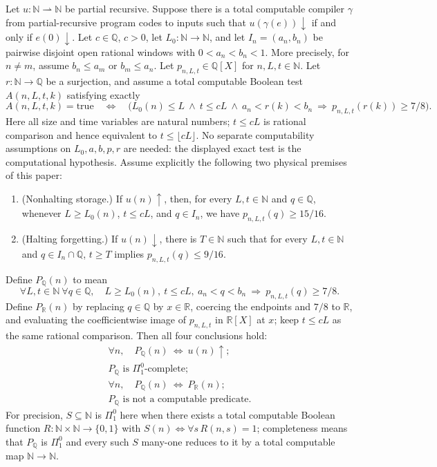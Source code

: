 \begin{theorem}
\label{lean:conditional}
Let $u:\mathbb N\rightharpoonup\mathbb N$ be partial recursive. Suppose there
is a total computable compiler $\gamma$ from partial-recursive program codes
to inputs such that $u(\gamma(e))\downarrow$ if and only if $e(0)\downarrow$.
Let $c\in\mathbb Q$, $c>0$, let $L_0:\mathbb N\to\mathbb N$, and let
$I_n=(a_n,b_n)$ be pairwise disjoint open rational windows with
$0<a_n<b_n<1$. More precisely, for $n\ne m$, assume
$b_n\le a_m$ or $b_m\le a_n$.
Let $p_{n,L,t}\in\mathbb Q[X]$ for $n,L,t\in\mathbb N$.
Let $r:\mathbb N\to\mathbb Q$ be a surjection, and assume a total
computable Boolean test $A(n,L,t,k)$ satisfying exactly
\[
 A(n,L,t,k)=\mathrm{true}\quad\Longleftrightarrow\quad
 \bigl(L_0(n)\le L\ \land\ t\le cL\ \land\ a_n<r(k)<b_n
       \ \Longrightarrow\ p_{n,L,t}(r(k))\ge 7/8\bigr).
\]
Here all size and time variables are natural numbers; $t\le cL$ is
rational comparison and hence equivalent to $t\le\lfloor cL\rfloor$.
No separate computability assumptions on $L_0,a,b,p,r$ are needed:
the displayed exact test is the computational hypothesis.
Assume explicitly the following two physical premises of this paper:
\begin{enumerate}
\item (Nonhalting storage.) If $u(n)\uparrow$, then, for every $L,t\in\mathbb N$
and $q\in\mathbb Q$, whenever $L\ge L_0(n)$, $t\le cL$, and $q\in I_n$,
we have $p_{n,L,t}(q)\ge15/16$.
\item (Halting forgetting.) If $u(n)\downarrow$, there is $T\in\mathbb N$
such that for every $L,t\in\mathbb N$ and $q\in I_n\cap\mathbb Q$,
$t\ge T$ implies $p_{n,L,t}(q)\le9/16$.
\end{enumerate}
Define $P_{\mathbb Q}(n)$ to mean
\[
 \forall L,t\in\mathbb N\ \forall q\in\mathbb Q,\quad
 L\ge L_0(n),\ t\le cL,\ a_n<q<b_n
 \ \Longrightarrow\ p_{n,L,t}(q)\ge7/8.
\]
Define $P_{\mathbb R}(n)$ by replacing $q\in\mathbb Q$ by $x\in\mathbb R$,
coercing the endpoints and $7/8$ to $\mathbb R$, and evaluating the
coefficientwise image of $p_{n,L,t}$ in $\mathbb R[X]$ at $x$; keep
$t\le cL$ as the same rational comparison.
Then all four conclusions hold:
\[
 \begin{gathered}
 \forall n,\quad P_{\mathbb Q}(n)\ \Longleftrightarrow\ u(n)\uparrow;\\
 P_{\mathbb Q}\text{ is }\Pi^0_1\text{-complete};\\
 \forall n,\quad P_{\mathbb Q}(n)\ \Longleftrightarrow\ P_{\mathbb R}(n);\\
 P_{\mathbb Q}\text{ is not a computable predicate}.
 \end{gathered}
\]
For precision, $S\subseteq\mathbb N$ is $\Pi^0_1$ here when there exists
a total computable Boolean function $R:\mathbb N\times\mathbb N\to\{0,1\}$
with $S(n)\Longleftrightarrow\forall s\,R(n,s)=1$; completeness means that
$P_{\mathbb Q}$ is $\Pi^0_1$ and every such $S$ many-one reduces to it
by a total computable map $\mathbb N\to\mathbb N$.
\end{theorem}
